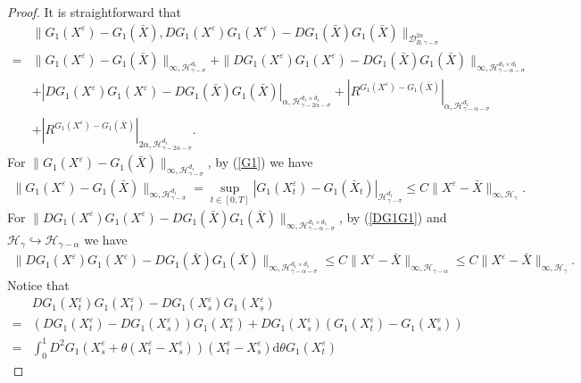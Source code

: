 \documentclass[10pt,a4paper]{amsart}
\begin{document}
\begin{proof}
	It is straightforward that
	\begin{align*}
		&\|G_1(X^\varepsilon)-G_1(\bar{X}),DG_1(X^\varepsilon)G_1(X^\varepsilon)-DG_1(\bar{X})G_1(\bar{X})\|_{\mathcal{D}_{ B,\gamma-\sigma}^{2\alpha}} \\
		=&\|G_1(X^\varepsilon)-G_1(\bar{X})\|_{\infty, \mathcal H_{\gamma-\sigma}^{d_1}}	
		+\|DG_1(X^\varepsilon)G_1(X^\varepsilon)-DG_1(\bar{X})G_1(\bar{X})\|_{\infty, \mathcal H_{\gamma-\alpha-\sigma}^{d_1 \times d_1}} \\
		&+|DG_1(X^\varepsilon)G_1(X^\varepsilon)-DG_1(\bar{X})G_1(\bar{X})|_{\alpha, \mathcal H_{\gamma-2\alpha-\sigma}^{d_1 \times d_1} }
		+|R^{G_1(X^\varepsilon)-G_1(\bar{X})}|_{\alpha, \mathcal H_{\gamma-\alpha-\sigma}^{d_1}} \\
		&+|R^{G_1(X^\varepsilon)-G_1(\bar{X})}|_{2\alpha, \mathcal H_{\gamma-2\alpha-\sigma}^{d_1}}.
	\end{align*}	
	For $\|G_1(X^\varepsilon)-G_1(\bar{X})\|_{\infty, \mathcal H_{\gamma-\sigma}^{d_1}}$, by (\ref{G1}) we have
	\begin{align}\label{Gdif1}
		\|G_1(X^\varepsilon)-G_1(\bar{X})\|_{\infty, \mathcal H_{\gamma-\sigma}^{d_1}}
		=\sup_{t\in [0,T]} |G_1(X_t^\varepsilon)-G_1(\bar{X}_t)|_{\mathcal H_{\gamma-\sigma}^{d_1}}
		\leq C\|X^\varepsilon-\bar{X}\|_{\infty, \mathcal H_{\gamma}}.
	\end{align}	
	For $\|DG_1(X^\varepsilon)G_1(X^\varepsilon)-DG_1(\bar{X})G_1(\bar{X})\|_{\infty, \mathcal H_{\gamma-\alpha-\sigma}^{d_1 \times d_1}} $, by (\ref{DG1G1}) and $\mathcal H_\gamma \hookrightarrow \mathcal H_{\gamma-\alpha}$ we have
	\begin{align}\label{Gdif2}
		\|DG_1(X^\varepsilon)G_1(X^\varepsilon)-DG_1(\bar{X})G_1(\bar{X})\|_{\infty, \mathcal H_{\gamma-\alpha-\sigma}^{d_1 \times d_1}}
		\leq C\|X^\varepsilon-\bar{X}\|_{\infty, \mathcal H_{\gamma-\alpha}}
		\leq C\|X^\varepsilon-\bar{X}\|_{\infty, \mathcal H_{\gamma}}.
	\end{align}
	Notice that	
	\begin{align*}
		&DG_1(X_t^\varepsilon)G_1(X_t^\varepsilon)-DG_1(X_s^\varepsilon)G_1(X_s^\varepsilon) \nonumber\\
		=&(DG_1(X_t^\varepsilon)-DG_1(X_s^\varepsilon)) G_1(X_t^\varepsilon)
		+DG_1(X_s^\varepsilon)(G_1(X_t^\varepsilon)-G_1(X_s^\varepsilon)) \nonumber\\
		=& \int_0^1 D^2 G_1 (X_s^\varepsilon+\theta(X_t^\varepsilon-X_s^\varepsilon)) (X_t^\varepsilon-X_s^\varepsilon) \mathrm{d} \theta G_1(X_t^\varepsilon)

\end{align*}
\end{proof}
\end{document}
